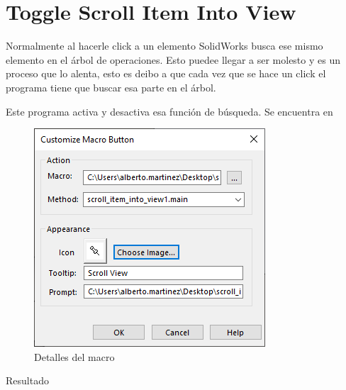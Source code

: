 \documentclass[12pt,letterpaper,final]{report}
\begin{document}
\section{Toggle Scroll Item Into View}

Normalmente al hacerle click a un elemento SolidWorks busca ese mismo elemento en el árbol de operaciones. Esto puedee llegar a ser molesto y es un proceso que lo alenta, esto es deibo a que cada vez que se hace un click el programa tiene que buscar esa parte en el árbol.

Este programa activa y desactiva esa función de búsqueda. Se encuentra en 

\begin{figure}[H]
	\centering
	\includegraphics[width=0.55\linewidth, height=0.5\textheight,keepaspectratio]{Imagenes/solidworks_macro_08}
	\caption{Detalles del macro}
	\label{fig:solidworksmacro08}
\end{figure}

{\LARGE Resultado}
\end{document}
